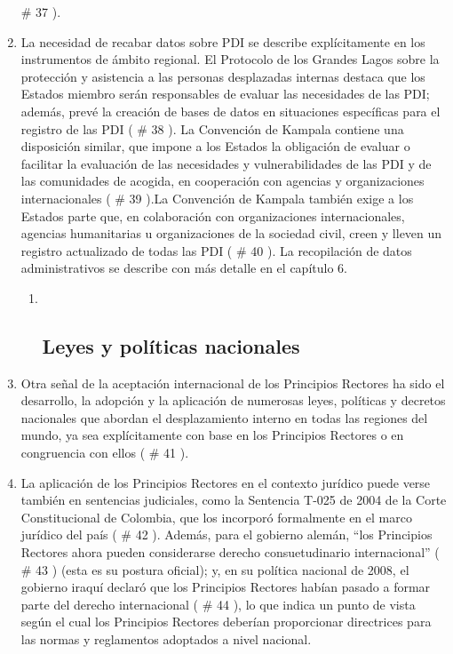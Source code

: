 \documentclass[
]{book}
\begin{document}
\begin{enumerate}
  \# 37
  ).
\item
  La necesidad de recabar datos sobre PDI se describe explícitamente en los instrumentos de ámbito regional. El Protocolo de los Grandes Lagos sobre la protección y asistencia a las personas desplazadas internas destaca que los Estados miembro serán responsables de evaluar las necesidades de las PDI; además, prevé la creación de bases de datos en situaciones específicas para el registro de las PDI (
  \# 38
  ). La Convención de Kampala contiene una disposición similar, que impone a los Estados la obligación de evaluar o facilitar la evaluación de las necesidades y vulnerabilidades de las PDI y de las comunidades de acogida, en cooperación con agencias y organizaciones internacionales (
  \# 39
  ).La Convención de Kampala también exige a los Estados parte que, en colaboración con organizaciones internacionales, agencias humanitarias u organizaciones de la sociedad civil, creen y lleven un registro actualizado de todas las PDI (
  \# 40
  ). La recopilación de datos administrativos se describe con más detalle en el capítulo 6.

  \begin{enumerate}
  \def\labelenumii{\arabic{enumii}.}
  \item ~
    \hypertarget{leyes-y-poluxedticas-nacionales}{%
    \subsection{Leyes y políticas nacionales}\label{leyes-y-poluxedticas-nacionales}}
  \end{enumerate}
\item
  Otra señal de la aceptación internacional de los Principios Rectores ha sido el desarrollo, la adopción y la aplicación de numerosas leyes, políticas y decretos nacionales que abordan el desplazamiento interno en todas las regiones del mundo, ya sea explícitamente con base en los Principios Rectores o en congruencia con ellos (
  \# 41
  ).
\item
  La aplicación de los Principios Rectores en el contexto jurídico puede verse también en sentencias judiciales, como la Sentencia T-025 de 2004 de la Corte Constitucional de Colombia, que los incorporó formalmente en el marco jurídico del país (
  \# 42
  ). Además, para el gobierno alemán, ``los Principios Rectores ahora pueden considerarse derecho consuetudinario internacional'' (
  \# 43
  ) (esta es su postura oficial); y, en su política nacional de 2008, el gobierno iraquí declaró que los Principios Rectores habían pasado a formar parte del derecho internacional (
  \# 44
  ), lo que indica un punto de vista según el cual los Principios Rectores deberían proporcionar directrices para las normas y reglamentos adoptados a nivel nacional.


\end{enumerate}
\end{document}
